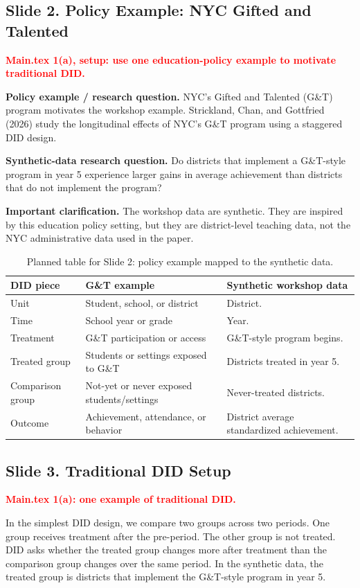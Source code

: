 \documentclass[11pt]{article}
\newcommand{\slideheading}[2]{%
  \subsection*{Slide #1. #2}
}
\newcommand{\slidecontent}[1]{#1}
\newcommand{\mainpoint}[1]{%
  \slidecontent{\textcolor{red}{\textbf{Main.tex #1}}}
}
\begin{document}
\slideheading{2}{Policy Example: NYC Gifted and Talented}
\mainpoint{1(a), setup: use one education-policy example to motivate traditional DID.}

\slidecontent{\textbf{Policy example / research question.} NYC's Gifted and
Talented (G\&T) program motivates the workshop example. Strickland, Chan, and
Gottfried (2026) study the longitudinal effects of NYC's G\&T program using a
staggered DID design.}

\slidecontent{\textbf{Synthetic-data research question.} Do districts that
implement a G\&T-style program in year 5 experience larger gains in average
achievement than districts that do not implement the program?}

\slidecontent{\textbf{Important clarification.} The workshop data are synthetic.
They are inspired by this education policy setting, but they are district-level
teaching data, not the NYC administrative data used in the paper.}

\begin{table}[H]
\centering
\small
\begin{tabular}{p{}p{}p{}}
\toprule
\textbf{DID piece} & \textbf{G\&T example} & \textbf{Synthetic workshop data} \\
\midrule
Unit & Student, school, or district & District. \\
Time & School year or grade & Year. \\
Treatment & G\&T participation or access & G\&T-style program begins. \\
Treated group & Students or settings exposed to G\&T & Districts treated in year 5. \\
Comparison group & Not-yet or never exposed students/settings & Never-treated districts. \\
Outcome & Achievement, attendance, or behavior & District average standardized achievement. \\
\bottomrule
\end{tabular}
\caption*{\footnotesize Planned table for Slide 2: policy example mapped to the synthetic data.}
\end{table}

\slideheading{3}{Traditional DID Setup}
\mainpoint{1(a): one example of traditional DID.}

\slidecontent{In the simplest DID design, we compare two groups across two
periods. One group receives treatment after the pre-period. The other group is
not treated. DID asks whether the treated group changes more after treatment
than the comparison group changes over the same period. In the synthetic data,
the treated group is districts that implement the G\&T-style program in year 5.}
\end{document}
